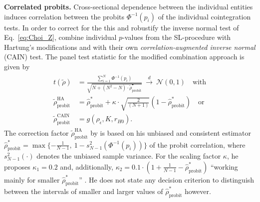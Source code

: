 \textbf{Correlated probits.} Cross-sectional dependence between the individual entities induces correlation between the probits $ \Phi^{-1} \left( p_i \right) $ of the individual cointegration tests. In order to correct for the this and robustify the inverse normal test of Eq.~\eqref{eq:Choi_Z}, \citet{ArsovaOersal2020} combine individual $p$-values from the SL-procedure with Hartung's \citeyearpar{Hartung1999} modifications and with their own \textit{correlation-augmented inverse normal} (CAIN) test. The panel test statistic for the modified combination approach is given by
\begin{align} \label{eq:CAIN}
\begin{split}
	t(\tilde{\rho}) & = \frac{ \sum_{i=1}^{N} \Phi^{-1} \left( p_i \right) }{\sqrt{ N + \left( N^2-N \right) \cdot \tilde{\rho}^\bullet_\text{probit} }} \ \overset{d}{\longrightarrow} \ \mathcal{N}(0,1) \quad \text{with} \\ %
	\tilde{\rho}^{\text{HA}}_\text{probit} & = \hat{\rho}^*_\text{probit} + \kappa \cdot \sqrt{ \frac{2}{ \left( N+1 \right) }} \left( 1 - \hat{\rho}^*_\text{probit} \right)  \quad \text{or} \\
	\tilde{\rho}^{\text{CAIN}}_\text{probit} & = g\left( \rho_\epsilon, K, r_{H0} \right). 
\end{split}
\end{align}
The correction factor $ \tilde{\rho}^{\text{HA}}_\text{probit} $ by \citet{Hartung1999} is based on his unbiased and consistent estimator $ \hat{\rho}^*_\text{probit} = \max \lbrace - \frac{1}{N-1}, \ 1 - s_{N-1}^2 \left( \Phi^{-1} \left( p_i \right) \right) \rbrace $ of the probit correlation, where $ s_{N-1}^2(\cdot) $ denotes the unbiased sample variance. For the scaling factor $ \kappa $, he proposes $ \kappa_1 = 0.2 $ and, additionally, $ \kappa_2 = 0.1 \cdot \left( 1 + \frac{1}{N-1} - \hat{\rho}^*_\text{probit} \right) $ ``working mainly for smaller $ \hat{\rho}^*_\text{probit} $'' \citep[p.~853]{Hartung1999}. He does not state any decision criterion to distinguish between the intervals of smaller and larger values of $ \hat{\rho}^*_\text{probit} $ however.

